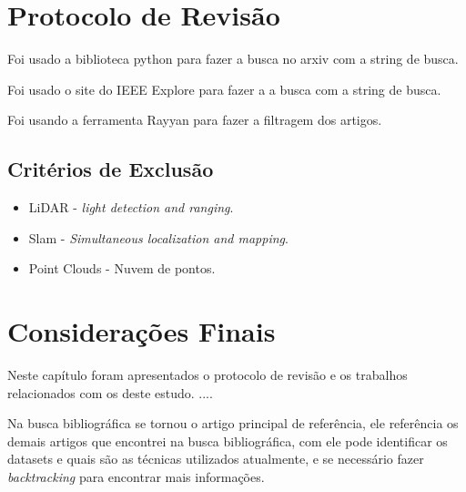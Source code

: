 



\section{Protocolo de Revisão}\label{cp:revisao:protocolo}

Foi usado a biblioteca python para fazer a busca no arxiv com a string de busca.

Foi usado o site do IEEE Explore para fazer a a busca com a string de busca.

Foi usando a ferramenta Rayyan para fazer a filtragem dos artigos.

\subsection{Critérios de Exclusão}
\begin{itemize}
    \item LiDAR - \textit{light detection and ranging}.
    \item Slam  - \textit{Simultaneous localization and mapping}.
    \item Point Clouds - Nuvem de pontos.    
\end{itemize}



\section{Considerações Finais}
Neste capítulo foram apresentados o protocolo de revisão e os trabalhos relacionados com os  deste estudo. ....


Na busca bibliográfica \cite{kratochvila2024multi} se tornou o artigo principal de referência, ele referência os demais artigos que encontrei na busca bibliográfica, com ele pode identificar os datasets e quais são as técnicas utilizados atualmente, e se necessário fazer \textit{backtracking} para encontrar mais informações.